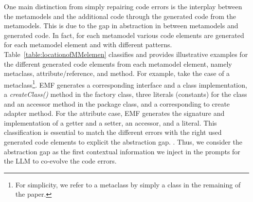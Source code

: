 One main distinction from simply repairing code errors is the interplay between the metamodels and the additional code through the generated code from the metamodels. This is due to the gap in abstraction in between metamodels and generated code. In fact, for each metamodel various code elements are generated for each metamodel element and with different patterns.
Table~\ref{table:locationofMMelemen} classifies and provides illustrative examples for the different generated code elements from each metamodel element, namely metaclass, attribute/reference, and method.  %
For example, take the case of a metaclass\footnote{For simplicity, we refer to a metaclass by simply a class in the remaining of the paper.}. EMF generates a corresponding interface and a class implementation, a \emph{createClass()} method in the factory class, three literals (\ie constants) for the class and an accessor method in the package class, and a corresponding to create adapter method. For the attribute case, EMF generates the signature and implementation of a getter and a setter, an accessor, and a literal. 
This classification is essential to match the different errors with the right used generated code elements to explicit the abstraction gap. . Thus, we consider the abstraction gap as the first contextual information we inject in the prompts for the LLM to co-evolve the code errors. 





